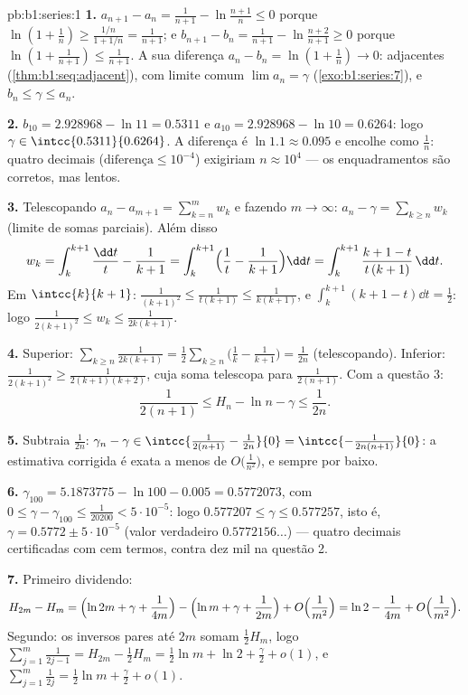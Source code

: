 \begin{solution}{pb:b1:series:1}
\textbf{1.} $a_{n+1} - a_n = \frac{1}{n+1} - \ln\frac{n+1}{n}
\leq 0$ porque $\ln(1 + \frac1n) \geq \frac{1/n}{1 + 1/n} =
\frac{1}{n+1}$; e $b_{n+1} - b_n = \frac{1}{n+1} -
\ln\frac{n+2}{n+1} \geq 0$ porque $\ln(1 + \frac{1}{n+1}) \leq
\frac{1}{n+1}$. A sua
diferença $a_n - b_n = \ln(1 + \frac1n) \to 0$:
adjacentes (\cref{thm:b1:seq:adjacent}), com limite comum $\lim
a_n = \gamma$ (\cref{exo:b1:series:7}), e $b_n \leq \gamma
\leq a_n$.

\textbf{2.} $b_{10} = 2.928968 - \ln 11 = 0.5311$ e $a_{10} =
2.928968 - \ln 10 = 0.6264$: logo $\gamma \in
\intcc{0.5311}{0.6264}$. A diferença é $\ln 1.1 \approx 0.095$ e
encolhe como $\frac1n$: quatro decimais ($\text{diferença} \leq
10^{-4}$) exigiriam $n \approx 10^4$
--- os enquadramentos são corretos, mas lentos.

\textbf{3.} Telescopando $a_n - a_{m+1} = \sum_{k=n}^{m} w_k$ e
fazendo $m \to \infty$: $a_n - \gamma = \sum_{k\geq n} w_k$
(limite de somas parciais). Além disso
\[
w_k = \int_k^{k+1} \frac{\dd t}{t} - \frac{1}{k+1}
= \int_k^{k+1} \Bigl(\frac1t - \frac{1}{k+1}\Bigr)\dd t
= \int_k^{k+1} \frac{k + 1 - t}{t\,(k+1)}\,\dd t .
\]
Em $\intcc{k}{k+1}$: $\frac{1}{(k+1)^2} \leq \frac{1}{t(k+1)}
\leq \frac{1}{k(k+1)}$, e $\int_k^{k+1}(k + 1 - t)\dd t =
\frac12$: logo $\frac{1}{2(k+1)^2} \leq w_k \leq
\frac{1}{2k(k+1)}$.

\textbf{4.} Superior: $\sum_{k \geq n} \frac{1}{2k(k+1)} =
\frac12\sum_{k\geq n}\bigl(\frac1k - \frac{1}{k+1}\bigr) =
\frac{1}{2n}$ (telescopando). Inferior: $\frac{1}{2(k+1)^2} \geq
\frac{1}{2(k+1)(k+2)}$, cuja
soma telescopa para $\frac{1}{2(n+1)}$. Com a questão 3:
\[
\frac{1}{2(n+1)} \leq H_n - \ln n - \gamma \leq \frac{1}{2n} .
\]

\textbf{5.} Subtraia $\frac{1}{2n}$: $\gamma_n - \gamma \in
\intcc{\frac{1}{2(n+1)} - \frac{1}{2n}}{0} =
\intcc{-\frac{1}{2n(n+1)}}{0}$: a estimativa corrigida é exata
a menos de $O\bigl(\frac{1}{n^2}\bigr)$, e sempre por baixo.

\textbf{6.} $\gamma_{100} = 5.1873775 - \ln 100 - 0.005 =
0.5772073$, com $0 \leq \gamma - \gamma_{100} \leq
\frac{1}{20200} < 5\cdot10^{-5}$: logo $0.577207 \leq \gamma
\leq 0.577257$, isto é, $\gamma = 0.5772 \pm 5\cdot10^{-5}$ (valor
verdadeiro $0.5772156\dots$) --- quatro decimais certificadas com
cem termos, contra dez mil na questão 2.

\textbf{7.} Primeiro dividendo:
\[
H_{2m} - H_m = \Bigl(\ln 2m + \gamma + \frac{1}{4m}\Bigr)
- \Bigl(\ln m + \gamma + \frac{1}{2m}\Bigr) +
O\Bigl(\frac{1}{m^2}\Bigr)
= \ln 2 - \frac{1}{4m} + O\Bigl(\frac{1}{m^2}\Bigr).
\]
Segundo: os inversos pares até $2m$ somam $\frac12 H_m$, logo
$\sum_{j=1}^{m}\frac{1}{2j-1} = H_{2m} - \frac12 H_m = \frac12
\ln m + \ln 2 + \frac\gamma2 + o(1)$, e $\sum_{j=1}^m
\frac{1}{2j} = \frac12\ln m + \frac\gamma2 + o(1)$.


\end{solution}
